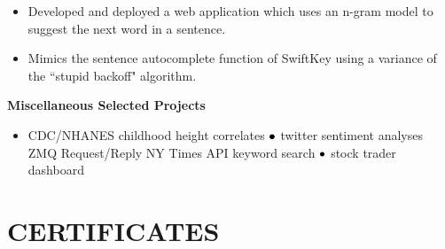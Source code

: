 \documentclass[margin,10pt]{res} %
\begin{document}
\begin{resume}
\begin{itemize}
\item Developed and deployed a web application which uses an n-gram model to suggest the next word in a sentence.
\item Mimics the sentence autocomplete function of SwiftKey using a variance of the ``stupid backoff" algorithm.
\end{itemize}%
\textbf{Miscellaneous Selected Projects}  \\%
\begin{itemize} %
\item CDC/NHANES childhood height correlates $\color{black}\bullet$ twitter sentiment analyses \\ ZMQ Request/Reply NY Times API keyword search  $\color{black}\bullet$ stock trader dashboard  
\end{itemize}
 


\section{CERTIFICATES
\newline
} 


\end{resume}
\end{document}
